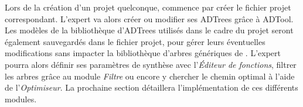 Lors de la création d'un projet quelconque, \glasir{} commence par créer le fichier projet correspondant. L'expert va alors créer ou modifier ses ADTrees grâce à ADTool. Les modèles de la bibliothèque d'ADTrees utilisés dans le cadre du projet seront également sauvegardés dans le fichier projet, pour gérer leurs éventuelles modifications sans impacter la bibliothèque d'arbres génériques de \glasir{}. L'expert pourra alors définir ses paramètres de synthèse avec l’\emph{Éditeur de fonctions}, filtrer les arbres grâce au module \emph{Filtre} ou encore y chercher le chemin optimal à l'aide de l'\emph{Optimiseur}. La prochaine section détaillera l'implémentation de ces différents modules. 